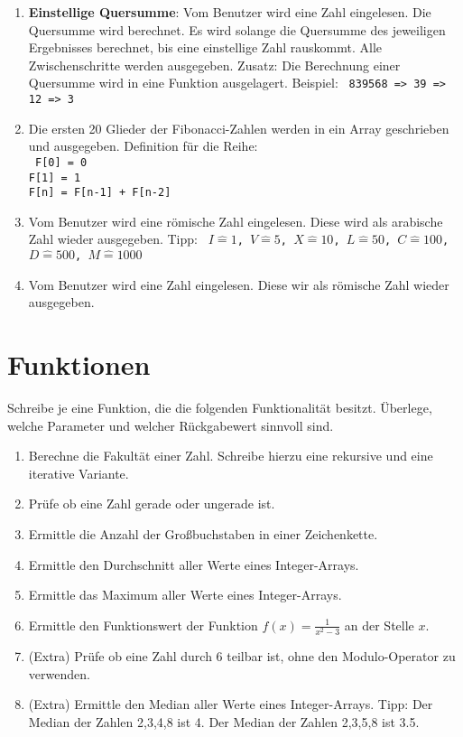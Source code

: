 \documentclass[]{scrartcl}
\begin{document}
\begin{enumerate}[{1)}]
	\item \textbf{Einstellige Quersumme}: Vom Benutzer wird eine Zahl eingelesen. Die Quersumme wird berechnet. Es wird solange die Quersumme des jeweiligen Ergebnisses berechnet, bis eine einstellige Zahl rauskommt. Alle Zwischenschritte werden ausgegeben. Zusatz: Die Berechnung einer Quersumme wird in eine Funktion ausgelagert. Beispiel:
	\texttt{
		839568 => 39 => 12 => 3
	}

	\item Die ersten 20 Glieder der Fibonacci-Zahlen werden in ein Array geschrieben und ausgegeben. Definition für die Reihe:\\
	\texttt{
		F[0] = 0\\
		F[1] = 1\\
		F[n] = F[n-1] + F[n-2]\\
	}

	\item Vom Benutzer wird eine römische Zahl eingelesen. Diese wird als arabische Zahl wieder ausgegeben. Tipp:
	\texttt{
		$I \widehat{=}    1$,
		$V \widehat{=}    5$,
		$X \widehat{=}   10$,
		$L \widehat{=}   50$,
		$C \widehat{=}  100$,
		$D \widehat{=}  500$,
		$M \widehat{=} 1000$
	}

	\item Vom Benutzer wird eine Zahl eingelesen. Diese wir als römische Zahl wieder ausgegeben.
\end{enumerate}

\section{Funktionen}
Schreibe je eine Funktion, die die folgenden Funktionalität besitzt. Überlege, welche Parameter und welcher Rückgabewert sinnvoll sind.

\begin{enumerate}[{1)}]
	\item Berechne die Fakultät einer Zahl. Schreibe hierzu eine rekursive und eine iterative Variante.
	
	\item Prüfe ob eine Zahl gerade oder ungerade ist.
	
	\item Ermittle die Anzahl der Großbuchstaben in einer Zeichenkette.
	
	\item Ermittle den Durchschnitt aller Werte eines Integer-Arrays.
	
	\item Ermittle das Maximum aller Werte eines Integer-Arrays.
	
	\item Ermittle den Funktionswert der Funktion $f(x) = \frac{1}{x^2 - 3}$ an der Stelle $x$.
	
	\item (Extra) Prüfe ob eine Zahl durch 6 teilbar ist, ohne den Modulo-Operator zu verwenden.
	
	\item (Extra) Ermittle den Median aller Werte eines Integer-Arrays. Tipp: Der Median der Zahlen 2,3,4,8 ist 4. Der Median der Zahlen 2,3,5,8 ist 3.5.
\end{enumerate}
\end{document}
